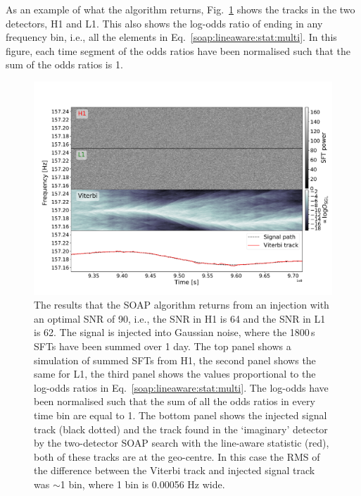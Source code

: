 %
%
As an example of what the algorithm returns, Fig.~\ref{soap:tracks} shows
the tracks in the two detectors, H1 and L1. This also shows the
log-odds ratio of ending in any
frequency bin, i.e., all the elements in Eq.~\ref{soap:lineaware:stat:multi}.  In this figure, each time segment of the odds ratios have been normalised such that the sum of the odds ratios is 1.



\begin{figure}
\includegraphics[scale=0.45]{C3_soap/viterbi_tracks.pdf}
%
\caption[Example of SOAP algorithms and outputs when run on H1 and L1 spectrograms.]{\label{soap:tracks} The results that the SOAP algorithm returns from an injection with an optimal
\gls{SNR} of 90, i.e., the \gls{SNR} in H1 is 64 and the \gls{SNR} in L1 is 62.
The signal is injected into Gaussian noise, where the 1800\,s \glspl{SFT} have been
summed over 1 day.  The top panel shows a simulation of summed \glspl{SFT} from H1, the second panel shows the same for L1,
the third panel shows the values proportional to the
log-odds ratios in Eq.~\ref{soap:lineaware:stat:multi}.
The log-odds have been normalised such that the sum of
all the odds ratios in every time bin are equal to 1. The bottom panel shows the injected signal track (black dotted) and the track found in the `imaginary' detector by the two-detector SOAP search with the line-aware statistic (red), both of these tracks are at the geo-centre. In this case the \gls{RMS} of the difference between the Viterbi track and injected signal track was $\sim$1 bin, where 1 bin is 0.00056 Hz wide.}
%
\end{figure}


